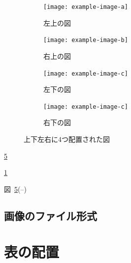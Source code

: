 \begin{figure}[tp]
    \centering
    \begin{subfigure}{0.45\textwidth}
        \centering
        \texttt{[image: example-image-a]}
        \caption{左上の図}
        \label{fig:sub1}
    \end{subfigure}
    \hfill %
    \begin{subfigure}{0.45\textwidth}
        \centering
        \texttt{[image: example-image-b]}
        \caption{右上の図}
        \label{fig:sub2}
    \end{subfigure}
    
    \vspace{5mm} %
    
    \begin{subfigure}[b]{0.45\textwidth}
        \centering
        \texttt{[image: example-image-c]}
        \caption{左下の図}
        \label{fig:sub3}
    \end{subfigure}
    \hfill %
    \begin{subfigure}[b]{0.45\textwidth}
        \centering
        \texttt{[image: example-image-c]}
        \caption{右下の図}
        \label{fig:sub4}
    \end{subfigure}
    \caption{上下左右に4つ配置された図}
    \label{fig:four_subfigures}
\end{figure}


\ref{fig:four_subfigures}

\ref{fig:sub1}

図~\ref{fig:four_subfigures}(--)




\subsection{画像のファイル形式}
\label{ssec:figure_format}



\section{表の配置}
\label{sec:table}






